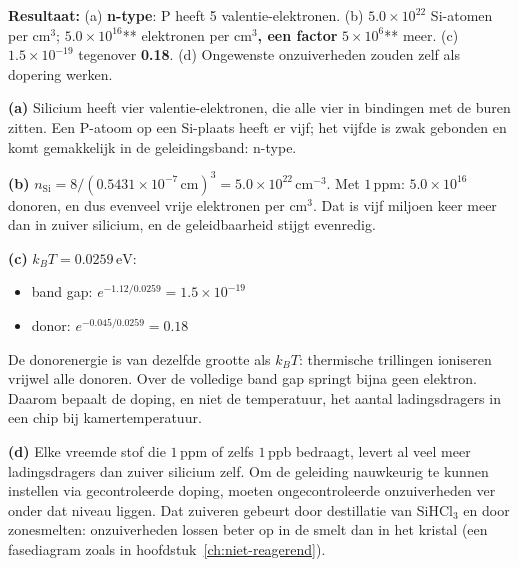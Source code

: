 \begin{oplossing}
\textbf{Resultaat:} (a) \textbf{n-type}: P heeft 5 valentie-elektronen. (b) \(5.0\times10^{22}\) Si-atomen per cm\ensuremath{^{3}}; \textbf{\(5.0\times10^{16}\)}** elektronen per cm\ensuremath{^{3}}\textbf{, een factor }\(5\times10^{6}\)** meer. (c) \(1.5\times10^{-19}\) tegenover \textbf{0.18}. (d) Ongewenste onzuiverheden zouden zelf als dopering werken.

\textbf{(a)} Silicium heeft vier valentie-elektronen, die alle vier in bindingen met de buren zitten. Een P-atoom op een Si-plaats heeft er vijf; het vijfde is zwak gebonden en komt gemakkelijk in de geleidingsband: n-type.

\textbf{(b)} \(n_{\mathrm{Si}} = 8/(0.5431\times10^{-7}\,\mathrm{cm})^3 = 5.0\times10^{22}\,\mathrm{cm^{-3}}\). Met \(1\,\mathrm{ppm}\): \(5.0\times10^{16}\) donoren, en dus evenveel vrije elektronen per cm\ensuremath{^{3}}. Dat is vijf miljoen keer meer dan in zuiver silicium, en de geleidbaarheid stijgt evenredig.

\textbf{(c)} \(k_BT = 0.0259\,\mathrm{eV}\):

\begin{itemize}
\item
  band gap: \(e^{-1.12/0.0259} = 1.5\times10^{-19}\)
\item
  donor: \(e^{-0.045/0.0259} = 0.18\)
\end{itemize}

De donorenergie is van dezelfde grootte als \(k_BT\): thermische trillingen ioniseren vrijwel alle donoren. Over de volledige band gap springt bijna geen elektron. Daarom bepaalt de doping, en niet de temperatuur, het aantal ladingsdragers in een chip bij kamertemperatuur.

\textbf{(d)} Elke vreemde stof die \(1\,\mathrm{ppm}\) of zelfs \(1\,\mathrm{ppb}\) bedraagt, levert al veel meer ladingsdragers dan zuiver silicium zelf. Om de geleiding nauwkeurig te kunnen instellen via gecontroleerde doping, moeten ongecontroleerde onzuiverheden ver onder dat niveau liggen. Dat zuiveren gebeurt door destillatie van \(\mathrm{SiHCl_3}\) en door zonesmelten: onzuiverheden lossen beter op in de smelt dan in het kristal (een fasediagram zoals in hoofdstuk~\ref{ch:niet-reagerend}).
\end{oplossing}

